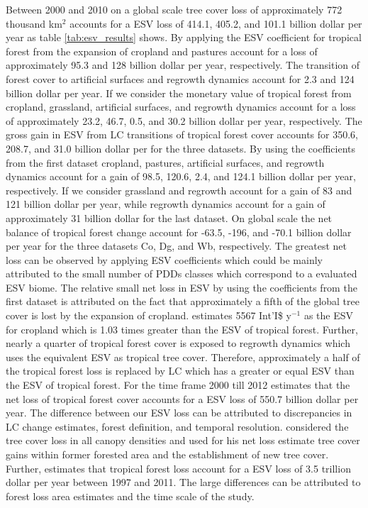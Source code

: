 		Between 2000 and 2010 on a global scale tree cover loss of approximately 772 thousand km$^2$ accounts for a \ac{ESV} loss of 414.1, 405.2, and 101.1 billion dollar per year as table \ref{tab:esv_results} shows. By applying the \ac{ESV} coefficient for tropical forest from \citet{Costanza2014} the expansion of cropland and pastures account for a loss of approximately 95.3 and 128 billion dollar per year, respectively. The transition of forest cover to artificial surfaces and regrowth dynamics account for 2.3 and 124 billion dollar per year. If we consider the monetary value of tropical forest from \citet{Siikamaki2015} cropland, grassland, artificial surfaces, and regrowth dynamics account for a loss of approximately 23.2, 46.7, 0.5, and 30.2 billion dollar per year, respectively. The gross gain in \ac{ESV} from \ac{LC} transitions of tropical forest cover accounts for 350.6, 208.7, and 31.0 billion dollar per for the three datasets. By using the coefficients from the first dataset cropland, pastures, artificial surfaces, and regrowth dynamics account for a gain of 98.5, 120.6, 2.4, and 124.1 billion dollar per year, respectively. If we consider \citet{Groot2012} grassland and regrowth account for a gain of 83 and 121 billion dollar per year, while regrowth dynamics account for a gain of approximately 31 billion dollar for the last dataset. On global scale the net balance of tropical forest change account for -63.5, -196, and -70.1 billion dollar per year for the three datasets Co, Dg, and Wb, respectively. The greatest net loss can be observed by applying \citeauthor{Groot2012} \ac{ESV} coefficients which could be mainly attributed to the small number of \acp{PDD} classes which correspond to a evaluated \ac{ESV} biome. The relative small net loss in \ac{ESV} by using the coefficients from the first dataset is attributed on the fact that approximately a fifth of the global tree cover is lost by the expansion of cropland. \citeauthor{Costanza2014} estimates 5567 Int'I\$ y$^{-1}$ as the \ac{ESV} for cropland which is 1.03 times greater than the \ac{ESV} of tropical forest. Further, nearly a quarter of tropical forest cover is exposed to regrowth dynamics which uses the equivalent \ac{ESV} as tropical tree cover. Therefore, approximately a half of the tropical forest loss is replaced by \ac{LC} which has a greater or equal \ac{ESV} than the \ac{ESV} of tropical forest. For the time frame 2000 till 2012 \citet{Song2018} estimates that the net loss of tropical forest cover accounts for a \ac{ESV} loss of 550.7 billion dollar per year. The difference between our \ac{ESV} loss can be attributed to discrepancies in \ac{LC} change estimates, forest definition, and temporal resolution. \citeauthor{Song2018} considered the tree cover loss in all canopy densities and used for his net loss estimate tree cover gains within former forested area and the establishment of new tree cover. Further, \citet{Costanza2014} estimates that tropical forest loss account for a \ac{ESV} loss of 3.5 trillion dollar per year between 1997 and 2011. The large differences can be attributed to forest loss area estimates and the time scale of the study. 

